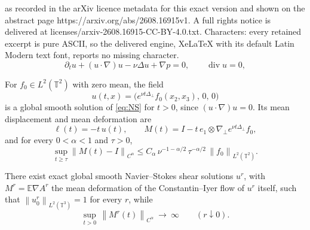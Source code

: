 \documentclass[10pt,a4paper]{amsart}
\DeclareMathOperator{\diver}{div}
\newcommand{\E}{\mathbb{E}}
\newcommand{\T}{\mathbb{T}}
\newcommand{\norm}[1]{\left\lVert #1\right\rVert}
\begin{document}
as recorded in the arXiv licence metadata for this exact version and shown on the abstract page https://arxiv.org/abs/2608.16915v1. A full rights notice is delivered at licenses/arxiv-2608.16915-CC-BY-4.0.txt. Characters: every retained excerpt is pure ASCII, so the delivered engine, XeLaTeX with its default Latin Modern text font, reports no missing character.
\begin{equation}\label{eq:NS}
  \partial_t u+(u\cdot\nabla)u-\nu\Delta u+\nabla p=0,\qquad \diver u=0,
\end{equation}

\begin{proposition}\label{prop:shearM}
For $f_0\in L^2(\T^2)$ with zero mean, the field
\[
  u(t,x)=\bigl(e^{\nu t\Delta_\perp}f_0(x_2,x_3),\,0,\,0\bigr)
\]
is a global smooth solution of \eqref{eq:NS} for $t>0$, since $(u\cdot\nabla)u=0$. Its
mean displacement and mean deformation are
\begin{equation}\label{eq:shearMformula}
  \ell(t)=-t\,u(t),\qquad
  M(t)=I-t\,e_1\otimes\nabla_\perp e^{\nu t\Delta_\perp}f_0 ,
\end{equation}
and for every $0<\alpha<1$ and $\tau>0$,
\begin{equation}\label{eq:shearM}
  \sup_{t\ge\tau}\norm{M(t)-I}_{C^\alpha}
  \le C_\alpha\,\nu^{-1-\alpha/2}\,\tau^{-\alpha/2}\,\norm{f_0}_{L^2(\T^2)} .
\end{equation}
\end{proposition}

\begin{proposition}\label{prop:localshear}
There exist exact global smooth Navier--Stokes shear solutions $u^r$, with
$M^r=\E\nabla A^r$ the mean deformation of the Constantin--Iyer flow of $u^r$ itself, such
that $\norm{u^r_0}_{L^2(\T^3)}=1$ for every $r$, while
\[
  \sup_{t>0}\,\norm{M^r(t)}_{C^\alpha}\ \longrightarrow\ \infty\qquad(r\downarrow0).
\]
\end{proposition}
\end{document}

